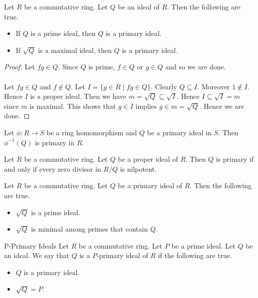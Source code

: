 \documentclass[a4paper]{article}
\begin{document}
\begin{lmm}{}{} Let $R$ be a commutative ring. Let $Q$ be an ideal of $R$. Then the following are true. 
\begin{itemize}
\item If $Q$ is a prime ideal, then $Q$ is a primary ideal. 
\item If $\sqrt{Q}$ is a maximal ideal, then $Q$ is a primary ideal. 
\end{itemize} 
\begin{proof}
Let $fg\in Q$. Since $Q$ is prime, $f\in Q$ or $g\in Q$ and so we are done. \\~\\

Let $fg\in Q$ and $f\notin Q$. Let $I=\{g\in R\;|\;fg\in Q\}$. Clearly $Q\subseteq I$. Moreover $1\notin I$. Hence $I$ is a proper ideal. Then we have $m=\sqrt{Q}\subseteq\sqrt{I}$. Hence $I\subseteq\sqrt{I}=m$ since $m$ is maximal. This shows that $g\in I$ implies $g\in m=\sqrt{Q}$. Hence we are done. 
\end{proof}
\end{lmm}

\begin{lmm}{}{} Let $\phi:R\to S$ be a ring homomorphism and $Q$ be a primary ideal in $S$. Then $\phi^{-1}(Q)$ is primary in $R$. 
\end{lmm}

\begin{prp}{}{} Let $R$ be a commutative ring. Let $Q$ be a proper ideal of $R$. Then $Q$ is primary if and only if every zero divisor in $R/Q$ is nilpotent. 
\end{prp}

\begin{lmm}{}{} Let $R$ be a commutative ring. Let $Q$ be a primary ideal of $R$. Then the following are true. 
\begin{itemize}
\item $\sqrt{Q}$ is a prime ideal. 
\item $\sqrt{Q}$ is minimal among primes that contain $Q$. 
\end{itemize}
\end{lmm}

\begin{defn}{P-Primary Ideals}{} Let $R$ be a commutative ring. Let $P$ be a prime ideal. Let $Q$ be an ideal. We say that $Q$ is a $P$-primary ideal of $R$ if the following are true. 
\begin{itemize}
\item $Q$ is a primary ideal. 
\item $\sqrt{Q}=P$. 
\end{itemize}
\end{defn}
\end{document}
